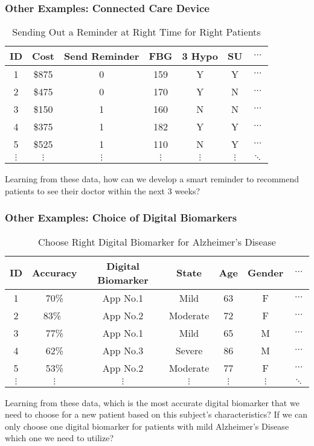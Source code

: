 \documentclass{beamer}
\begin{document}
\begin{frame}
	\frametitle{Other Examples:  Connected Care Device}
	\begin{table}[htbp]
		\centering
		\caption{Sending Out a Reminder at Right Time for Right Patients}
		\begin{tabular}{c|c|c|cccc}
			\hline
			\hline
			ID&  Cost   & Send Reminder & FBG  &  3 Hypo & SU & $\cdots$ \\
			\hline
			1& \$875  & 0  & 159   & Y  &  Y  & $\cdots$ \\
			2 &  \$475 & 0  &   170   & Y  & N & $\cdots$  \\
			3 & \$150 & 1  & 160   & N   & N& $\cdots$  \\
			4& \$375 & 1   & 182  & Y  & Y   & $\cdots$  \\
			5& \$525 & 1  & 110     & N  & Y   & $\cdots$  \\
			$\vdots$  & $\vdots$  & $\vdots$    & $\vdots$   & $\vdots$     & $\vdots$     & $\ddots$  \\
			\hline
			\hline
		\end{tabular}%
		\label{tab:ITRDataProblem5}%
	\end{table}%
	
	Learning from these data, how can we develop a smart reminder to recommend patients to see their doctor within the next 3 weeks?
\end{frame}

\begin{frame}
	\frametitle{Other Examples: Choice of Digital Biomarkers}
	\begin{table}[htbp]
		\centering
		\caption{Choose Right Digital Biomarker for Alzheimer's Disease}
		\begin{tabular}{c|c|c|cccc}
			\hline
			\hline
			ID&  Accuracy   & Digital Biomarker  & State  &  Age  & Gender & $\cdots$ \\
			\hline
			1& 70\%  & App No.1   & Mild    & 63   & F   & $\cdots$ \\
			2 & 83\%\  & App No.2     &   Moderate   & 72    & F   & $\cdots$  \\
			3 & 77\% & App No.1   & Mild     & 65    & M   & $\cdots$  \\
			4& 62\% & App No.3     & Severe    & 86    & M   & $\cdots$  \\
			5& 53\%  & App No.2   & Moderate      & 77    & F   & $\cdots$  \\
			$\vdots$  & $\vdots$  & $\vdots$    & $\vdots$   & $\vdots$     & $\vdots$     & $\ddots$  \\
			\hline
			\hline
		\end{tabular}%
		\label{tab:ITRDataProblem4}%
	\end{table}%
	
	Learning from these data, which is the most accurate digital biomarker that we need to choose for a new patient based on this subject's characteristics? If we can only choose one digital biomarker for patients with mild  Alzheimer's Disease which one we need to utilize?
\end{frame}
\end{document}

